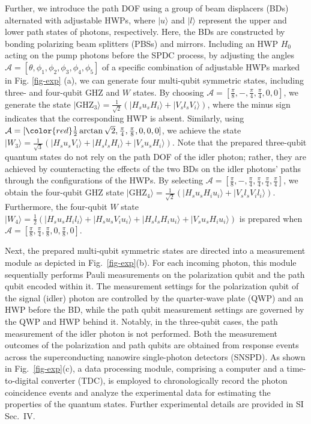 \documentclass[prl,aps,twocolumn,notitlepage,superscriptaddress,showpacs,nofootinbib]{revtex4-2}
\newcommand{\red}[1]{{\color{red} #1}}
\begin{document}
{Further, we introduce the path DOF using a group of beam displacers (BDs) alternated with adjustable HWPs, where $|u\rangle$ and $|l\rangle$ represent the upper and lower path states of photons, respectively.  Here, the BDs are constructed by bonding polarizing beam splitters (PBSs) and mirrors. Including an HWP $H_0$ acting on the pump photons before the SPDC process, by adjusting the angles $\mathcal{A}=[\theta,\phi_1,\phi_2,\phi_3,\phi_4,\phi_5]$ of a specific combination of adjustable HWPs marked in Fig. \ref{fig-exp} (a), we can generate four multi-qubit symmetric states, including three- and four-qubit GHZ and $W$ states. By choosing $\mathcal{A}=[\frac{\pi}{8},-,\frac{\pi}{4},\frac{\pi}{4},0,0]$, we generate the state $|\text{GHZ}_3\rangle=\frac{1}{\sqrt{2}}(|H_su_sH_i\rangle+|V_sl_sV_i\rangle)$, where the minus sign indicates that the corresponding HWP is absent. Similarly, using $\mathcal{A}=[\red{\frac{1}{2}\arctan{\sqrt{2}}},\frac{\pi}{4},\frac{\pi}{8},0,0,0]$, we achieve the state $|W_3\rangle=\frac{1}{\sqrt{3}}(|H_su_sV_i\rangle+|H_sl_sH_i\rangle+|V_su_sH_i\rangle)$. Note that the prepared three-qubit quantum states do not rely on the path DOF of the idler photon; rather, they are achieved by counteracting the effects of the two BDs on the idler photons' paths through the configurations of the HWPs. By selecting $\mathcal{A}=[\frac{\pi}{8},-,\frac{\pi}{4},\frac{\pi}{4},\frac{\pi}{4},\frac{\pi}{4}]$, we obtain the four-qubit GHZ state $|\text{GHZ}_4\rangle=\frac{1}{\sqrt{2}}(|H_su_sH_iu_i\rangle+|V_sl_sV_il_i\rangle)$. Furthermore, the four-qubit $W$ state $|W_4\rangle=\frac{1}{2}(|H_su_sH_il_i\rangle+|H_su_sV_iu_i\rangle+|H_sl_sH_iu_i\rangle+|V_su_sH_iu_i\rangle)$ is prepared when $\mathcal{A}=[\frac{\pi}{8},\frac{\pi}{4},\frac{\pi}{8},0,\frac{\pi}{8},0]$.

Next, the prepared multi-qubit symmetric states are directed into a measurement module as depicted in Fig.~\ref{fig-exp}(b). For each incoming photon, this module sequentially performs Pauli measurements on the polarization qubit and the path qubit encoded within it. The measurement settings for the polarization qubit of the signal (idler) photon are controlled by the quarter-wave plate (QWP) and an HWP  before the BD, while the path qubit measurement settings are governed by the QWP and HWP behind it. Notably, in the three-qubit cases, the path measurement of the idler photon is not performed. Both the measurement outcomes of the polarization and path qubits are obtained from response events across the superconducting nanowire single-photon detectors (SNSPD). As shown in Fig.~\ref{fig-exp}(c), a data processing module, comprising a computer and a time-to-digital converter (TDC), is employed to chronologically record the photon coincidence events and analyze the experimental data for estimating the properties of the quantum states. Further experimental details are provided in SI Sec.~IV.}
\end{document}
